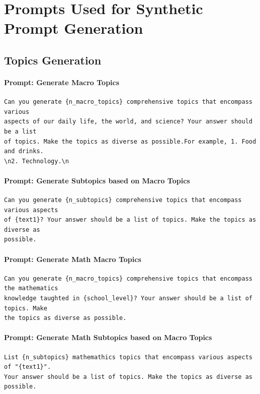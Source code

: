 \documentclass[11pt]{article}
\begin{document}
\section{Prompts Used for Synthetic Prompt Generation}\label{app:prompts-gen}

\subsection{Topics Generation}

\paragraph{Prompt: Generate Macro Topics}
\begin{verbatim}
Can you generate {n_macro_topics} comprehensive topics that encompass various 
aspects of our daily life, the world, and science? Your answer should be a list
of topics. Make the topics as diverse as possible.For example, 1. Food and drinks.
\n2. Technology.\n
\end{verbatim}

\paragraph{Prompt: Generate Subtopics based on Macro Topics}
\begin{verbatim}
Can you generate {n_subtopics} comprehensive topics that encompass various aspects
of {text1}? Your answer should be a list of topics. Make the topics as diverse as
possible.
\end{verbatim}


\paragraph{Prompt: Generate Math Macro Topics}
\begin{verbatim}
Can you generate {n_macro_topics} comprehensive topics that encompass the mathematics
knowledge taughted in {school_level}? Your answer should be a list of topics. Make
the topics as diverse as possible.
\end{verbatim}

\paragraph{Prompt: Generate Math Subtopics based on Macro Topics}
\begin{verbatim}
List {n_subtopics} mathemathics topics that encompass various aspects of "{text1}". 
Your answer should be a list of topics. Make the topics as diverse as possible.
\end{verbatim}
\end{document}
